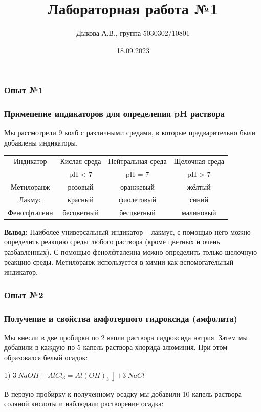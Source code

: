 \documentclass[12pt, a4paper]{article}
\title{Лабораторная работа №1}
\author{Дыкова А.В., группа 5030302/10801}
\date{18.09.2023}
\begin{document}
	
	\subsubsection*{Опыт №1}
	\subsubsection*{Применение индикаторов для определения pH раствора}
	
	Мы рассмотрели 9 колб с различными средами, в которые предварительно были добавлены индикаторы.
	
	\begin{center}
		\begin{tabular}{|c|c|c|c|}
			\hline
			Индикатор & Кислая среда & Нейтральная среда & Щелочная среда \\
			& pH < 7 & pH = 7 & pH > 7 \\
			\hline
			Метилоранж & розовый & оранжевый & жёлтый \\
			\hline
			Лакмус & красный & фиолетовый & синий \\
			\hline
			Фенолфталеин & бесцветный & бесцветный & малиновый \\
			\hline
		\end{tabular}
	\end{center}
	
	\textbf{Вывод:} Наиболее универсальный индикатор -- лакмус, с помощью него можно определить реакцию среды любого раствора (кроме цветных и очень разбавленных). С помощью фенолфталеина можно определить только щелочную реакцию среды. Метилоранж используется в химии как вспомогательный индикатор.
	
	\subsubsection*{Опыт №2}
	\subsubsection*{Получение и свойства амфотерного гидроксида (амфолита)}
	
	Мы внесли в две пробирки по 2 капли раствора гидроксида натрия. Затем мы добавили в каждую по 5 капель раствора хлорида алюминия. При этом образовался белый осадок:
	
	1) $3\ NaOH + AlCl_{3} = Al(OH)_{3} \downarrow + 3\ NaCl$ 
	
	В первую пробирку к полученному осадку мы добавили 10 капель раствора соляной кислоты и наблюдали растворение осадка:
	
\end{document}
